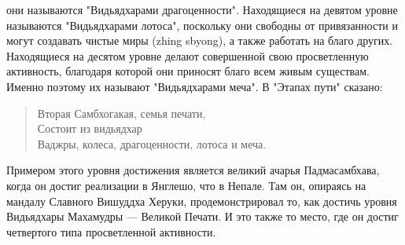 они называются "Видьядхарами драгоценности". Находящиеся на девятом уровне
называются "Видьядхарами лотоса", поскольку они свободны от привязанности и могут
создавать чистые миры (zhing sbyong), а также работать на благо других. Находящиеся на
десятом уровне делают совершенной свою просветленную активность, благодаря которой
они приносят благо всем живым существам. Именно поэтому их называют "Видьядхарами
меча". В "Этапах пути" сказано:
\begin{verse}
Вторая Самбхогакая, семья печати,\\
Состоит из видьядхар\\
Ваджры, колеса, драгоценности, лотоса и меча.
\end{verse}
Примером этого уровня достижения является великий ачарья Падмасамбхава, когда
он достиг реализации в Янглешо, что в Непале. Там он, опираясь на мандалу Славного
Вишуддха Херуки, продемонстрировал то, как достичь уровня Видьядхары Махамудры —
Великой Печати. И это также то место, где он достиг четвертого типа просветленной
активности.
